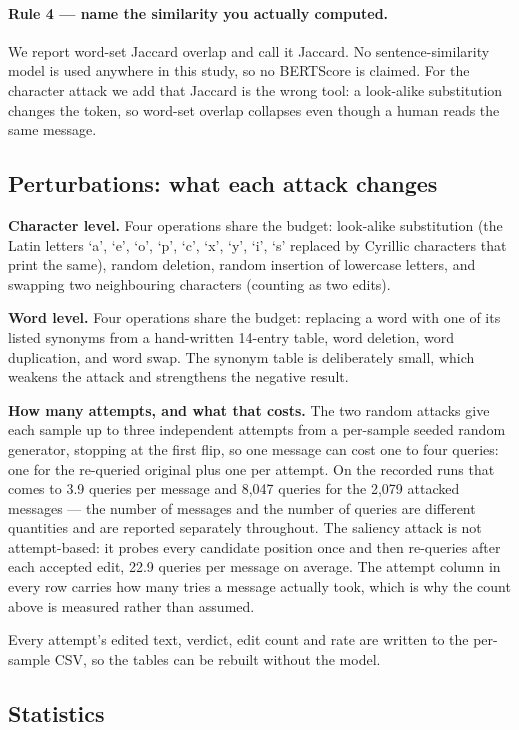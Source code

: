 \paragraph{Rule 4 --- name the similarity you actually computed.}
We report word-set Jaccard overlap and call it Jaccard. No sentence-similarity
model is used anywhere in this study, so no BERTScore is claimed. For the
character attack we add that Jaccard is the wrong tool: a look-alike substitution
changes the token, so word-set overlap collapses even though a human reads the
same message.

\subsection{Perturbations: what each attack changes}

\textbf{Character level.} Four operations share the budget: look-alike
substitution (the Latin letters `a', `e', `o', `p', `c', `x', `y', `i', `s'
replaced by Cyrillic characters that print the same), random deletion, random
insertion of lowercase letters, and swapping two neighbouring characters
(counting as two edits).

\textbf{Word level.} Four operations share the budget: replacing a word with one
of its listed synonyms from a hand-written 14-entry table, word deletion, word
duplication, and word swap. The synonym table is deliberately small, which
weakens the attack and strengthens the negative result.

\textbf{How many attempts, and what that costs.} The two random attacks give each
sample up to three independent attempts from a per-sample seeded random
generator, stopping at the first flip, so one message can cost one to four
queries: one for the re-queried original plus one per attempt. On the recorded
runs that comes to 3.9 queries per message and 8{,}047 queries for the 2{,}079
attacked messages --- the number of messages and the number of queries are
different quantities and are reported separately throughout. The saliency attack
is not attempt-based: it probes every candidate position once and then re-queries
after each accepted edit, 22.9 queries per message on average. The attempt column
in every row carries how many tries a message actually took, which is why the
count above is measured rather than assumed.

Every attempt's edited text, verdict, edit count and rate are written to the
per-sample CSV, so the tables can be rebuilt without the model.

\subsection{Statistics}

